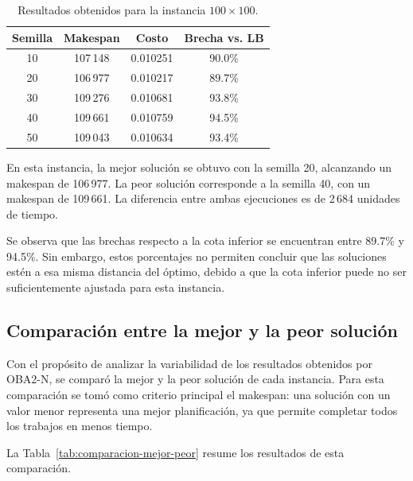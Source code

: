 \documentclass[12pt,a4paper]{article}
\begin{document}
\begin{table}[H]
    \centering
    \caption{Resultados obtenidos para la instancia $100 \times 100$.}
    \label{tab:resultados-100x100}
    \begin{tabular}{cccc}
        \hline
        \textbf{Semilla} & \textbf{Makespan} & \textbf{Costo} & \textbf{Brecha vs. LB} \\
        \hline
        10 & 107\,148 & 0.010251 & 90.0\% \\
        20 & 106\,977 & 0.010217 & 89.7\% \\
        30 & 109\,276 & 0.010681 & 93.8\% \\
        40 & 109\,661 & 0.010759 & 94.5\% \\
        50 & 109\,043 & 0.010634 & 93.4\% \\
        \hline
    \end{tabular}
\end{table}

En esta instancia, la mejor solución se obtuvo con la semilla 20, alcanzando un makespan de 106\,977. La peor solución corresponde a la semilla 40, con un makespan de 109\,661. La diferencia entre ambas ejecuciones es de 2\,684 unidades de tiempo.

Se observa que las brechas respecto a la cota inferior se encuentran entre 89.7\% y 94.5\%. Sin embargo, estos porcentajes no permiten concluir que las soluciones estén a esa misma distancia del óptimo, debido a que la cota inferior puede no ser suficientemente ajustada para esta instancia.

\subsection{Comparación entre la mejor y la peor solución}
\label{subsec:comparacion-mejor-peor}

Con el propósito de analizar la variabilidad de los resultados obtenidos por OBA2-N, se comparó la mejor y la peor solución de cada instancia. Para esta comparación se tomó como criterio principal el makespan: una solución con un valor menor representa una mejor planificación, ya que permite completar todos los trabajos en menos tiempo.

La Tabla~\ref{tab:comparacion-mejor-peor} resume los resultados de esta comparación.
\end{document}
